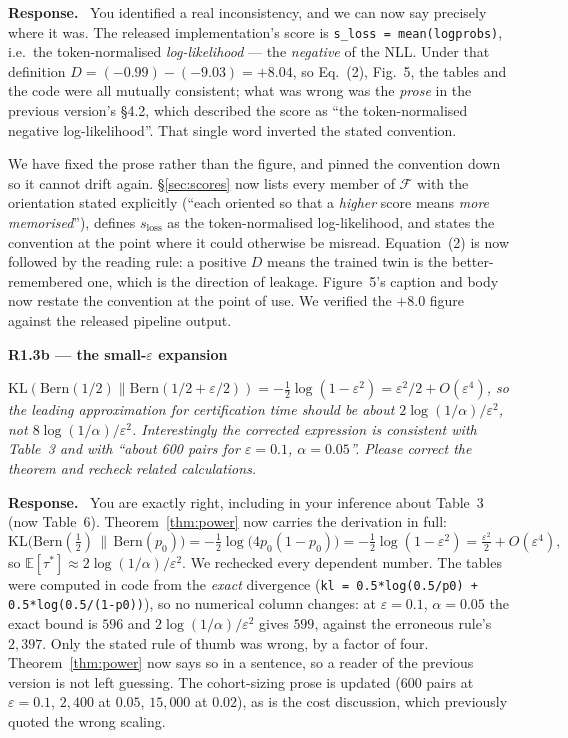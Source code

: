 \documentclass[11pt,a4paper]{article}
\newcommand{\eps}{\varepsilon}
\newcommand{\F}{\mathcal{F}}
\newenvironment{point}[1]{%
  \par\medskip\noindent\textbf{\color{rcol}#1}\par\nopagebreak\smallskip\begingroup
  \color{rcol}\itshape}{\endgroup\par}
\newenvironment{reply}{%
  \par\smallskip\noindent\textbf{\color{acol}Response.}\ \begingroup}{\endgroup\par}
\begin{document}
\begin{reply}
You identified a real inconsistency, and we can now say precisely where it was. The
released implementation's score is \texttt{s\_loss = mean(logprobs)}, i.e.\ the
token-normalised \emph{log-likelihood} --- the \emph{negative} of the NLL. Under that
definition $D = (-0.99) - (-9.03) = +8.04$, so Eq.~(2), Fig.~5, the tables and the code
were all mutually consistent; what was wrong was the \emph{prose} in the previous version's \S4.2, which
described the score as ``the token-normalised negative log-likelihood''. That single
word inverted the stated convention.

We have fixed the prose rather than the figure, and pinned the convention down so it
cannot drift again. \S\ref{sec:scores} now lists every member of $\F$ with the orientation stated
explicitly (``each oriented so that a \emph{higher} score means \emph{more
memorised}''), defines $s_{\mathrm{loss}}$ as the token-normalised log-likelihood, and
states the convention at the point where it could otherwise be misread. Equation~(2) is now
followed by the reading rule: a positive $D$ means the trained twin is the
better-remembered one, which is the direction of leakage. Figure~5's caption and body
now restate the convention at the point of use. We verified the $+8.0$ figure against
the released pipeline output.
\end{reply}

\begin{point}{R1.3b --- the small-$\eps$ expansion}
$\mathrm{KL}(\mathrm{Bern}(1/2)\|\mathrm{Bern}(1/2+\eps/2)) = -\tfrac12\log(1-\eps^2)
= \eps^2/2 + O(\eps^4)$, so the leading approximation for certification time should be
about $2\log(1/\alpha)/\eps^2$, not $8\log(1/\alpha)/\eps^2$. Interestingly the
corrected expression is consistent with Table~3 and with ``about 600 pairs for
$\eps=0.1$, $\alpha=0.05$''. Please correct the theorem and recheck related
calculations.
\end{point}

\begin{reply}
You are exactly right, including in your inference about Table~3 (now Table~6). Theorem~\ref{thm:power} now carries
the derivation in full:
\[
\mathrm{KL}\bigl(\mathrm{Bern}(\tfrac12)\,\|\,\mathrm{Bern}(p_0)\bigr)
= -\tfrac12\log\bigl(4p_0(1-p_0)\bigr) = -\tfrac12\log(1-\eps^2)
= \tfrac{\eps^2}{2} + O(\eps^4),
\]
so $\mathbb{E}[\tau^*] \approx 2\log(1/\alpha)/\eps^2$. We rechecked every dependent
number. The tables were computed in code from the \emph{exact} divergence
(\texttt{kl = 0.5*log(0.5/p0) + 0.5*log(0.5/(1-p0))}), so no numerical column changes:
at $\eps=0.1$, $\alpha=0.05$ the exact bound is $596$ and $2\log(1/\alpha)/\eps^2$ gives
$599$, against the erroneous rule's $2{,}397$. Only the stated rule of thumb was wrong,
by a factor of four. Theorem~\ref{thm:power} now says so in a sentence, so a reader of the previous
version is not left guessing. The cohort-sizing prose is updated ($600$ pairs at
$\eps=0.1$, $2{,}400$ at $0.05$, $15{,}000$ at $0.02$), as is the cost discussion, which
previously quoted the wrong scaling.
\end{reply}
\end{document}

